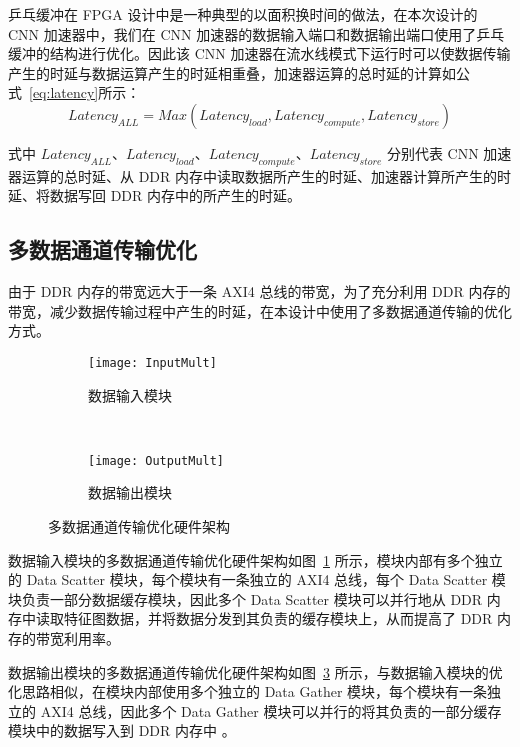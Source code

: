 乒乓缓冲在 FPGA 设计中是一种典型的以面积换时间的做法，在本次设计的 CNN 加速器中，我们在 CNN 加速器的数据输入端口和数据输出端口使用了乒乓缓冲的结构进行优化。因此该 CNN 加速器在流水线模式下运行时可以使数据传输产生的时延与数据运算产生的时延相重叠，加速器运算的总时延的计算如公式~\ref{eq:latency}所示：
\begin{equation} \label{eq:latency}
Latency_{ALL} = Max(Latency_{load},Latency_{compute},Latency_{store})
\end{equation}

式中 $Latency_{ALL}$、$Latency_{load}$、$Latency_{compute}$、$Latency_{store}$ 分别代表 CNN 加速器运算的总时延、从 DDR 内存中读取数据所产生的时延、加速器计算所产生的时延、将数据写回 DDR 内存中的所产生的时延。

\subsection{多数据通道传输优化}

由于 DDR 内存的带宽远大于一条 AXI4 总线的带宽，为了充分利用 DDR 内存的带宽，减少数据传输过程中产生的时延，在本设计中使用了多数据通道传输的优化方式。

\begin{figure}[!htbp]
    \centering
    \begin{subfigure}[b]{0.70\textwidth}
        \texttt{[image: InputMult]}
        \caption{数据输入模块}
        \label{fig:InputMult}
    \end{subfigure}
    \\%
    \begin{subfigure}[b]{0.70\textwidth}
        \texttt{[image: OutputMult]}
        \caption{数据输出模块}
        \label{fig:OutputMult}
    \end{subfigure}
    \caption{多数据通道传输优化硬件架构}
\end{figure}

数据输入模块的多数据通道传输优化硬件架构如图~\ref{fig:InputMult} 所示，模块内部有多个独立的 Data Scatter 模块，每个模块有一条独立的 AXI4 总线，每个 Data Scatter 模块负责一部分数据缓存模块，因此多个 Data Scatter 模块可以并行地从 DDR 内存中读取特征图数据，并将数据分发到其负责的缓存模块上，从而提高了 DDR 内存的带宽利用率。

数据输出模块的多数据通道传输优化硬件架构如图~\ref{fig:OutputMult} 所示，与数据输入模块的优化思路相似，在模块内部使用多个独立的 Data Gather 模块，每个模块有一条独立的 AXI4 总线，因此多个 Data Gather 模块可以并行的将其负责的一部分缓存模块中的数据写入到 DDR 内存中 。

